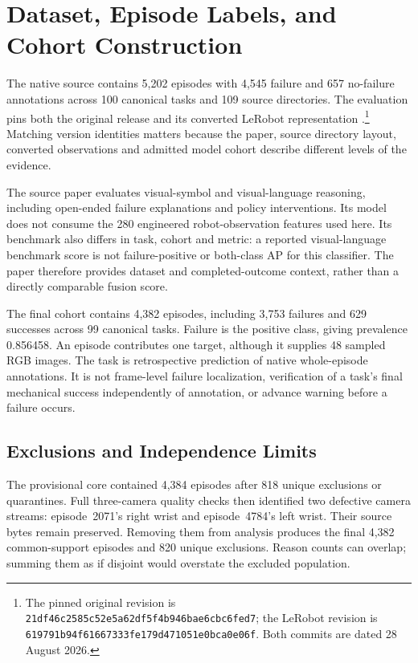 \section{Dataset, Episode Labels, and Cohort Construction}
The native source contains 5,202 episodes with 4,545 failure and 657 no-failure
annotations across 100 canonical tasks and 109 source directories. The evaluation pins
both the original release and its converted LeRobot representation
\parencite{ViFailbackHF2025,ViFailbackLeRobotHF}.\footnote{The pinned original revision
is \nolinkurl{21df46c2585c52e5a62df5f4b946bae6cbc6fed7}; the LeRobot revision is
\nolinkurl{619791b94f61667333fe179d471051e0bca0e06f}. Both commits are dated
28 August 2026.}
Matching version identities matters because the paper, source
directory layout, converted observations and admitted model cohort describe different
levels of the evidence.

The source paper evaluates visual-symbol and visual-language reasoning, including
open-ended failure explanations and policy interventions. Its model does not consume the
280 engineered robot-observation features used here. Its benchmark also differs in task,
cohort and metric: a reported visual-language benchmark score is not failure-positive or
both-class AP for this classifier. The paper therefore provides dataset and
completed-outcome context, rather than a directly comparable fusion score.

The final cohort contains 4,382 episodes, including 3,753 failures and 629 successes
across 99 canonical tasks. Failure is the positive class, giving prevalence 0.856458. An
episode contributes one target, although it supplies 48 sampled RGB images. The task is
retrospective prediction of native whole-episode annotations. It is not frame-level
failure localization, verification of a task's final mechanical success independently of
annotation, or advance warning before a failure occurs.

\subsection{Exclusions and Independence Limits}
The provisional core contained 4,384 episodes after 818 unique exclusions or
quarantines. Full three-camera quality checks then identified two defective camera
streams: episode~2071's right wrist and episode~4784's left wrist. Their source bytes
remain preserved. Removing them from analysis produces the final 4,382 common-support
episodes and 820 unique exclusions. Reason counts can overlap; summing them as if
disjoint would overstate the excluded population.

